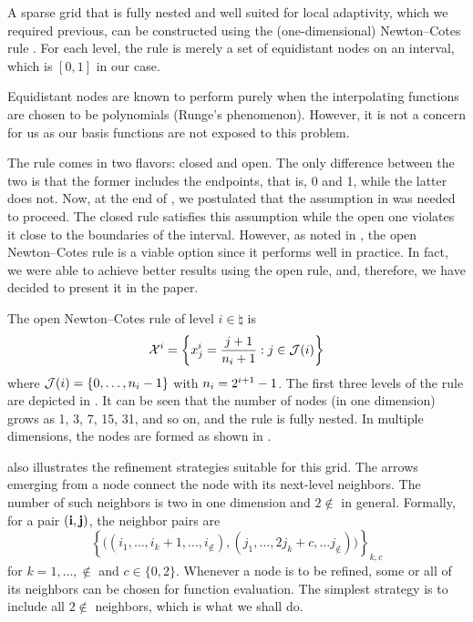 A sparse grid that is fully nested and well suited for local adaptivity, which
we required previous, can be constructed using the (one-dimensional)
Newton--Cotes rule \cite{klimke2006, ma2009}. For each level, the rule is merely
a set of equidistant nodes on an interval, which is $[0, 1]$ in our case.

\begin{remark}
Equidistant nodes are known to perform purely when the interpolating functions
are chosen to be polynomials (Runge's phenomenon). However, it is not a concern
for us as our basis functions are not exposed to this problem.
\end{remark}

The rule comes in two flavors: closed and open. The only difference between the
two is that the former includes the endpoints, that is, 0 and 1, while the
latter does not. Now, at the end of , we postulated that
the assumption in  was needed to proceed. The closed rule
satisfies this assumption while the open one violates it close to the boundaries
of the interval. However, as noted in \cite{klimke2006}, the open Newton--Cotes
rule is a viable option since it performs well in practice. In fact, we were
able to achieve better results using the open rule, and, therefore, we have
decided to present it in the paper.


The open Newton--Cotes rule of level $i \in \natural$ is
\[
  \mathcal{X}^i = \left\{ x^i_j = \frac{j + 1}{n_i + 1}: j \in \mathcal{J}(i) \right\}
\]
where $\mathcal{J}(i) = \left\{ 0, \dots, n_i - 1 \right\}$ with $n_i = 2^{i + 1} -
1$. The first three levels of the rule are depicted in . It can be
seen that the number of nodes (in one dimension) grows as 1, 3, 7, 15, 31, and
so on, and the rule is fully nested. In multiple dimensions, the nodes are
formed as shown in .

 also illustrates the refinement strategies suitable for this grid.
The arrows emerging from a node connect the node with its next-level neighbors.
The number of such neighbors is two in one dimension and $2 \nin$ in general.
Formally, for a pair $(\mathbf{i}, \mathbf{j})$, the neighbor pairs are
\[
  \left\{ \Big( (i_1, \dots, i_k + 1, \dots, i_\nin), (j_1, \dots, 2 j_k + c, \dots j_\nin) \Big) \right\}_{k, c}
\]
for $k = 1, \dots, \nin$ and $c \in \{ 0, 2 \}$. Whenever a node is to be
refined, some or all of its neighbors can be chosen for function evaluation. The
simplest strategy is to include all $2 \nin$ neighbors, which is what we shall
do.
